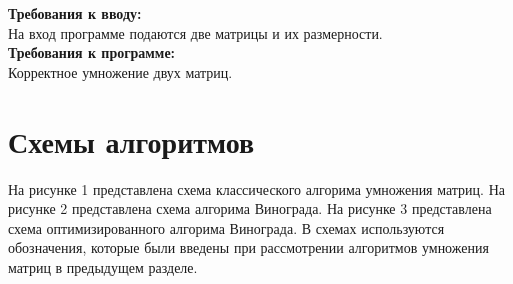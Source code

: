 \documentclass[a4paper,14pt]{report}
\begin{document}
\textbf{Требования к вводу:}\\
На вход программе подаются две матрицы и их размерности.\\

\textbf{Требования к программе:}\\
Корректное умножение двух матриц.\\




\section*{Схемы алгоритмов}

На рисунке 1 представлена схема классического алгорима умножения матриц. На рисунке 2 представлена схема алгорима Винограда. На рисунке 3 представлена схема оптимизированного алгорима Винограда. В схемах используются обозначения, которые были введены при рассмотрении алгоритмов умножения матриц в предыдущем разделе.
\end{document}

